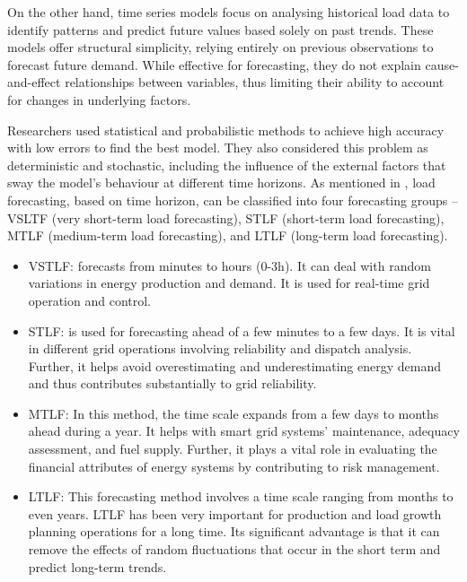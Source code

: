\documentclass[mstat,12pt]{unswthesis}
\begin{document}
On the other hand, time series models focus on analysing historical load
data to identify patterns and predict future values based solely on past
trends. These models offer structural simplicity, relying entirely on
previous observations to forecast future demand. While effective for
forecasting, they do not explain cause-and-effect relationships between
variables, thus limiting their ability to account for changes in
underlying factors.

\bigskip

Researchers used statistical and probabilistic methods to achieve high
accuracy with low errors to find the best model. They also considered
this problem as deterministic and stochastic, including the influence of
the external factors that sway the model's behaviour at different time
horizons. As mentioned in \cite{9812604}, load forecasting, based on
time horizon, can be classified into four forecasting groups -- VSLTF
(very short-term load forecasting), STLF (short-term load forecasting),
MTLF (medium-term load forecasting), and LTLF (long-term load
forecasting).

\begin{itemize}
\item
  VSTLF: forecasts from minutes to hours (0-3h). It can deal with random
  variations in energy production and demand. It is used for real-time
  grid operation and control.
\item
  STLF: is used for forecasting ahead of a few minutes to a few days. It
  is vital in different grid operations involving reliability and
  dispatch analysis. Further, it helps avoid overestimating and
  underestimating energy demand and thus contributes substantially to
  grid reliability.
\item
  MTLF: In this method, the time scale expands from a few days to months
  ahead during a year. It helps with smart grid systems' maintenance,
  adequacy assessment, and fuel supply. Further, it plays a vital role
  in evaluating the financial attributes of energy systems by
  contributing to risk management.
\item
  LTLF: This forecasting method involves a time scale ranging from
  months to even years. LTLF has been very important for production and
  load growth planning operations for a long time. Its significant
  advantage is that it can remove the effects of random fluctuations
  that occur in the short term and predict long-term trends.
\end{itemize}

\bigskip
\end{document}
